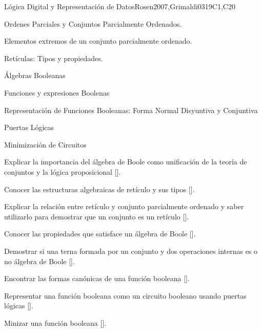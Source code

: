\begin{syllabus}
\begin{unit}{}{Lógica Digital y Representación de Datos}{Rosen2007,Grimaldi03}{19}{C1,C20}
   \begin{topics}
	\item Ordenes Parciales y Conjuntos Parcialmente Ordenados.
 	\item Elementos extremos de un conjunto parcialmente ordenado.
	\item Retículas: Tipos y propiedades.
	\item Álgebras Booleanas
	\item Funciones y expresiones Boolenas
	\item Representación de Funciones Booleanas: Forma Normal Disyuntiva y Conjuntiva
	\item Puertas Lógicas
	\item Minimización de Circuitos
   \end{topics}
   \begin{learningoutcomes}
	\item Explicar la importancia del álgebra de Boole como unificación de la teoría de conjuntos y la lógica proposicional [\Assessment].
	\item Conocer las estructuras algebraicas de retículo y sus tipos [\Assessment].
	\item Explicar la relación entre retículo y conjunto parcialmente ordenado y saber utilizarlo para demostrar que un conjunto es un retículo [\Assessment].
	\item Conocer las propiedades que satisface un álgebra de Boole  [\Assessment].
	\item Demostrar si una terna formada por un conjunto y dos operaciones internas es o no álgebra de Boole [\Assessment].
	\item Encontrar las formas canónicas de una función booleana  [\Assessment].
	\item Representar una función booleana como un circuito booleano usando puertas lógicas  [\Assessment].
	\item Minizar una función booleana [\Assessment].
    \end{learningoutcomes}
 \end{unit}



\begin{coursebibliography}
\end{coursebibliography}

\end{syllabus}

%
